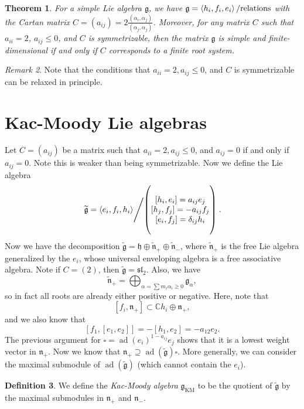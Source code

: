 \documentclass[leqno, openany]{memoir}
\newtheorem{thm}{Theorem}[section]
\theoremstyle{definition}
\newtheorem{defn}[thm]{Definition}
\theoremstyle{remark}
\newtheorem{rmk}[thm]{Remark}
\theoremstyle{plain}
\theoremstyle{definition}
\theoremstyle{remark}
\newcommand{\C}{\mathbb{C}}
\newcommand{\mf}[1]{\mathfrak{#1}}
\newcommand{\mr}[1]{\mathrm{#1}}
\newcommand{\wtl}[1]{\widetilde{#1}}
\DeclareMathOperator{\ad}{ad}
\begin{document}
\begin{thm} For a simple Lie algebra $\mf{g}$, we have $\mf{g} = \ev{h_i, f_i,
    e_i} / \text{relations}$ with the Cartan matrix $C = (a_{ij}) = 2
    \frac{(\alpha_i, \alpha_j)}{(\alpha_j, \alpha_j)}$. Moreover, for any
    matrix $C$ such that $a_{ii} = 2$, $a_{ij} \leq 0$, and $C$ is
    symmetrizable, then the matrix $\mf{g}$ is simple and finite-dimensional if
    and only if $C$ corresponds to a finite root system.  \end{thm}

\begin{rmk} Note that the conditions that $a_{ii} = 2, a_{ij} \leq 0$, and $C$
is symmetrizable can be relaxed in principle.  \end{rmk}

\section{Kac-Moody Lie algebras}%

Let $C = (a_{ij})$ be a matrix such that $a_{ii} = 2, a_{ij} \leq 0$, and
$a_{ij} = 0$ if and only if $a_{ij} = 0$. Note this is weaker than being
symmetrizable. Now we define the Lie algebra \[ \left. \wtl{\mf{g}} = \ev{e_i,
f_i, h_i} \middle/ \qty( \Vectorstack{ {[h_i, e_i] = a_{ij} e_j} {[h_j, f_j] =
-a_{ij} f_j} {[e_i, f_j] = \delta_{ij} h_i} } ) \right. . \] Now we have the
decomposition $\wtl{\mf{g}} = \mf{h} \oplus \wtl{\mf{n}}_+ \oplus
\wtl{\mf{n}}_-$, where $\wtl{\mf{n}}_+$ is the free Lie algebra generalized by
the $e_i$, whose universal enveloping algebra is a free associative algebra.
Note if $C = (2)$, then $\wtl{\mf{g}} = \mf{sl}_2$. Also, we have \[
    \wtl{\mf{n}}_+ = \bigoplus_{\alpha = \sum m_i \alpha_i \geq 0}
    \mf{g}_{\alpha}, \] so in fact all roots are already either positive or
    negative. Here, note that \[ [f_i, \mf{n}_+] \subset \C h_i \oplus
    \mf{n}_+, \] and we also know that \[ [f_1, [e_1, e_2]] = -[h_1, e_2] =
-a_{12} e_2. \] The previous argument for $\square = {\ad(e_i)}^{1-a_{ij}} e_j$
shows that it is a lowest weight vector in $\mf{n}_+$. Now we know that
$\mf{n}_+ \supseteq \ad(\wtl{\mf{g}}) \square$. More generally, we can consider
the maximal submodule of $\ad(\wtl{\mf{g}})$ (which cannot contain the $e_i$). 

\begin{defn} We define the \textit{Kac-Moody algebra} $\mf{g}_{\mr{KM}}$ to be
the quotient of $\wtl{\mf{g}}$ by the maximal submodules in $\mf{n}_+$ and
$\mf{n}_-$.  \end{defn}
\end{document}
